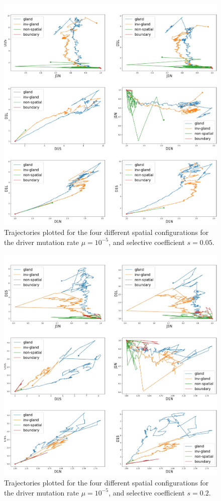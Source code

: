\begin{figure}[h]
\centering
\includegraphics[width=\textwidth]{Chapter_3/figures/1e05005new.pdf}
\caption{Trajectories plotted for the four different spatial configurations for
    the driver mutation rate $\mu=10^{-5}$, and selective coefficient
    $s=0.05$.}
\label{fig:1e05005new}
\end{figure}

\begin{figure}[h]
\centering
\includegraphics[width=\textwidth]{Chapter_3/figures/1e0502new.pdf}
\caption{Trajectories plotted for the four different spatial configurations for
    the driver mutation rate $\mu=10^{-5}$, and selective coefficient
    $s=0.2$.}
\label{fig:1e0502new}
\end{figure}


